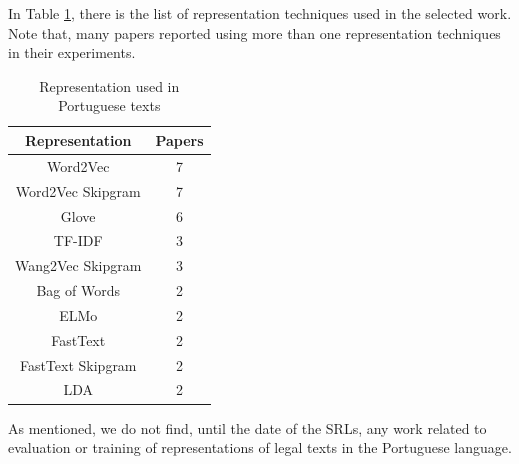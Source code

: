 In Table \ref{tab:rsl_representation_portuguese}, there is the list of representation techniques used in the selected work. Note that, many papers reported using more than one representation techniques in their experiments.

\begin{table}[htb]
\centering
\caption{Representation used in Portuguese texts}
\label{tab:rsl_representation_portuguese}
\begin{tabular}{cc}
\hline
\textbf{Representation} & \textbf{Papers} \\ \hline
Word2Vec                & 7               \\
Word2Vec Skipgram       & 7               \\
Glove                   & 6               \\
TF-IDF                  & 3               \\
Wang2Vec Skipgram       & 3               \\
Bag of Words            & 2               \\
ELMo                    & 2               \\
FastText                & 2               \\
FastText Skipgram       & 2               \\
LDA                     & 2              \\ \bottomrule
\end{tabular}
\end{table}


As mentioned, we do not find, until the date of the SRLs, any work related to evaluation or training of representations of  legal texts in the Portuguese language.

